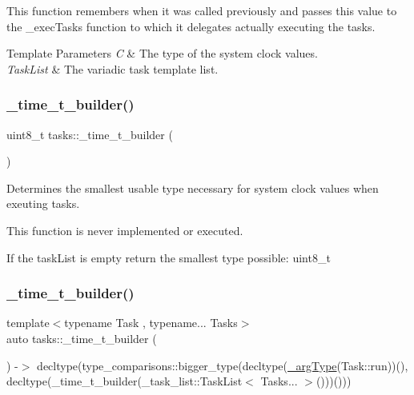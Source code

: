 This function remembers when it was called previously and passes this value to the \+\_\+exec\+Tasks function to which it delegates actually executing the tasks.


\begin{DoxyTemplParams}{Template Parameters}
{\em C} & The type of the system clock values. \\
\hline
{\em Task\+List} & The variadic task template list. \\
\hline
\end{DoxyTemplParams}
\hypertarget{namespacetasks_a9469b8fb917e0f3ec0168293ac046a4c}{}\label{namespacetasks_a9469b8fb917e0f3ec0168293ac046a4c} 
\subsubsection{\texorpdfstring{\+\_\+time\+\_\+t\+\_\+builder()}{\_time\_t\_builder()}\hspace{0.1cm}{\footnotesize\ttfamily [1/2]}}
{\footnotesize\ttfamily uint8\+\_\+t tasks\+::\+\_\+time\+\_\+t\+\_\+builder (\begin{DoxyParamCaption}\item[{const \+\_\+task\+\_\+list\+::\+Task\+List$<$$>$ \&}]{ }\end{DoxyParamCaption})}



Determines the smallest usable type necessary for system clock values when exeuting tasks. 

This function is never implemented or executed.

If the task\+List is empty return the smallest type possible\+: uint8\+\_\+t \hypertarget{namespacetasks_ac1dcc4748bce4b593356740b7a26343c}{}\label{namespacetasks_ac1dcc4748bce4b593356740b7a26343c} 
\subsubsection{\texorpdfstring{\+\_\+time\+\_\+t\+\_\+builder()}{\_time\_t\_builder()}\hspace{0.1cm}{\footnotesize\ttfamily [2/2]}}
{\footnotesize\ttfamily template$<$typename Task , typename... Tasks$>$ \\
auto tasks\+::\+\_\+time\+\_\+t\+\_\+builder (\begin{DoxyParamCaption}\item[{const \+\_\+task\+\_\+list\+::\+Task\+List$<$ Task, Tasks... $>$ \&}]{ }\end{DoxyParamCaption}) -\/$>$  decltype(type\+\_\+comparisons\+::bigger\+\_\+type(decltype(\hyperlink{namespacetasks_ac4a797a86584958bef0b67616a38c8ae}{\+\_\+arg\+Type}(Task\+::run))(), decltype(\+\_\+time\+\_\+t\+\_\+builder(\+\_\+task\+\_\+list\+::\+Task\+List$<$ Tasks... $>$()))()))}



